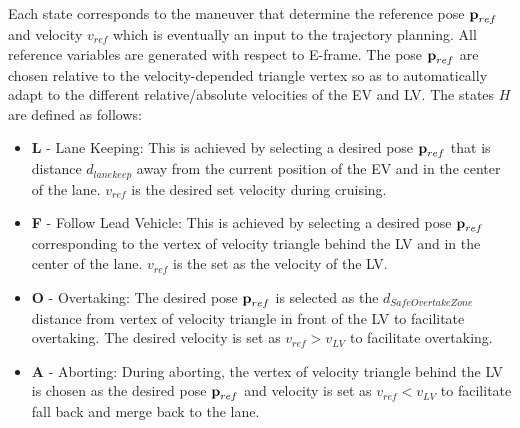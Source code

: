 \documentclass[letterpaper, 10 pt, conference]{ieeeconf}
\begin{document}
Each state corresponds to the maneuver that determine the reference pose $\textbf{\text{p}}_{ref}$ and velocity $v_{ref}$ which is eventually an input to the trajectory planning. All reference variables are generated with respect to E-frame. The pose $\textbf{\text{p}}_{ref}$ are chosen relative to the velocity-depended triangle vertex so as to automatically adapt to the different relative/absolute velocities of the EV and LV. The states $H$ are defined as follows:
\begin{itemize}
    \item \textbf{L} - Lane Keeping: This is achieved by selecting a desired pose $\textbf{\text{p}}_{ref}$ that is distance $d_{lanekeep}$ away from the current position of the EV and in the center of the lane. $v_{ref}$ is the desired set velocity during cruising.
    \item \textbf{F} - Follow Lead Vehicle: This is achieved by selecting a desired pose $\textbf{\text{p}}_{ref}$ corresponding to the vertex of velocity triangle behind the LV and in the center of the lane. $v_{ref}$ is the set as the velocity of the LV.
    \item \textbf{O} - Overtaking: The desired pose $\textbf{\text{p}}_{ref}$ is selected as the $d_{SafeOvertakeZone}$ distance from vertex of velocity triangle in front of the LV to facilitate overtaking. The desired velocity is set as $v_{ref} > v_{LV}$ to facilitate overtaking. 
    \item \textbf{A} - Aborting: During aborting, the vertex of velocity triangle behind the LV is chosen as the desired pose $\textbf{\text{p}}_{ref}$ and velocity is set as $v_{ref} < v_{LV}$ to facilitate fall back and merge back to the lane.  
\end{itemize}
\end{document}
